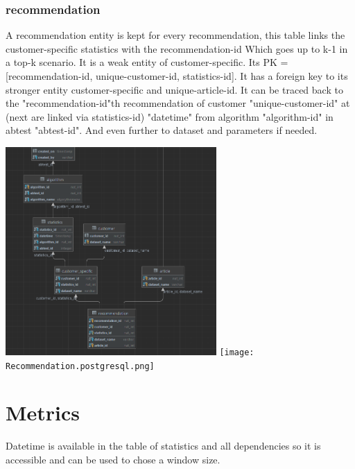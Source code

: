 \documentclass[a4paper,12pt]{article}
\begin{document}
	\subsubsection{recommendation}
	A recommendation entity is kept for every recommendation, this table links the customer-specific statistics with the recommendation-id Which goes up to k-1 in a top-k scenario. It is a weak entity of customer-specific. Its PK = [recommendation-id, unique-customer-id, statistics-id]. It has a foreign key to its stronger entity customer-specific and unique-article-id. It can be traced back to the "recommendation-id"th recommendation of customer "unique-customer-id" at (next are linked via statistics-id) "datetime" from algorithm "algorithm-id" in abtest "abtest-id". And even further to dataset and parameters if needed.  
	\begin{center}

		\includegraphics[height={300px}]{Customer-Specific.png}
		\texttt{[image: Recommendation.postgresql.png]}

\end{center}		
\section{Metrics}
Datetime is available in the table of statistics and all dependencies so it is accessible and can be used to chose a window size. 
\end{document}
